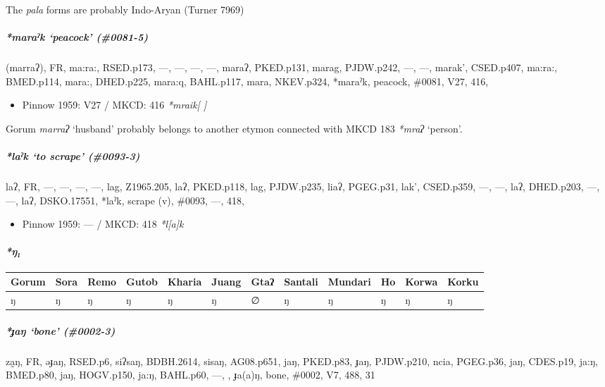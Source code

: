 \documentclass[a4paper,]{article}
\providecommand{\tightlist}{%
  \setlength{\itemsep}{0pt}\setlength{\parskip}{0pt}}
\let\oldparagraph\paragraph
\renewcommand{\paragraph}[1]{\oldparagraph{#1}\mbox{}}
\let\oldsubparagraph\subparagraph
\renewcommand{\subparagraph}[1]{\oldsubparagraph{#1}\mbox{}}
\begin{document}
The \emph{pala} forms are probably Indo-Aryan (Turner 7969)

\subparagraph{\texorpdfstring{\emph{*maraˀk} `peacock'
(\#0081-5)}{*maraˀk peacock (\#0081-5)}}\label{maraux2c0k-peacock-0081-5}

(marraʔ), FR, ma:ra:, RSED.p173, ---, ---, ---, ---, maraʔ, PKED.p131,
marag, PJDW.p242, ---, ---, marak', CSED.p407, ma:ra:, BMED.p114, mara:,
DHED.p225, mara:q, BAHL.p117, mara, NKEV.p324, *maraˀk, peacock, \#0081,
V27, 416,

\begin{itemize}
\tightlist
\item
  Pinnow 1959: V27 / MKCD: 416 \emph{*mraik{[} {]}}
\end{itemize}

Gorum \emph{marraʔ} `husband' probably belongs to another etymon
connected with MKCD 183 \emph{*mraʔ} `person'.

\subparagraph{\texorpdfstring{\emph{*laˀk} `to scrape'
(\#0093-3)}{*laˀk to scrape (\#0093-3)}}\label{laux2c0k-to-scrape-0093-3}

laʔ, FR, ---, ---, ---, ---, lag, Z1965.205, laʔ, PKED.p118, lag,
PJDW.p235, liaʔ, PGEG.p31, lak', CSED.p359, ---, ---, laʔ, DHED.p203,
---, ---, laʔ, DSKO.17551, *laˀk, scrape (v), \#0093, ---, 418,

\begin{itemize}
\tightlist
\item
  Pinnow 1959: --- / MKCD: 418 \emph{*l{[}a{]}k}
\end{itemize}

\paragraph{\texorpdfstring{\emph{*ŋ₁}}{*ŋ₁}}\label{ux14b}

\begin{longtable}[]{@{}llllllllllll@{}}
\toprule
Gorum & Sora & Remo & Gutob & Kharia & Juang & Gtaʔ & Santali & Mundari
& Ho & Korwa & Korku\tabularnewline
\midrule
\endhead
ŋ & ŋ & ŋ & ŋ & ŋ & ŋ & ∅ & ŋ & ŋ & ŋ & ŋ & ŋ\tabularnewline
\bottomrule
\end{longtable}

\subparagraph{\texorpdfstring{\emph{*ɟaŋ} `bone'
(\#0002-3)}{*ɟaŋ bone (\#0002-3)}}\label{ux25faux14b-bone-0002-3}

za̰ŋ, FR, əɟaŋ, RSED.p6, siʔsaŋ, BDBH.2614, sisaŋ, AG08.p651, jaŋ,
PKED.p83, ɟaŋ, PJDW.p210, ncia, PGEG.p36, jaŋ, CDES.p19, ja:ŋ, BMED.p80,
jaŋ, HOGV.p150, ja:ŋ, BAHL.p60, ---, , ɟa(a)ŋ, bone, \#0002, V7, 488, 31
\end{document}
